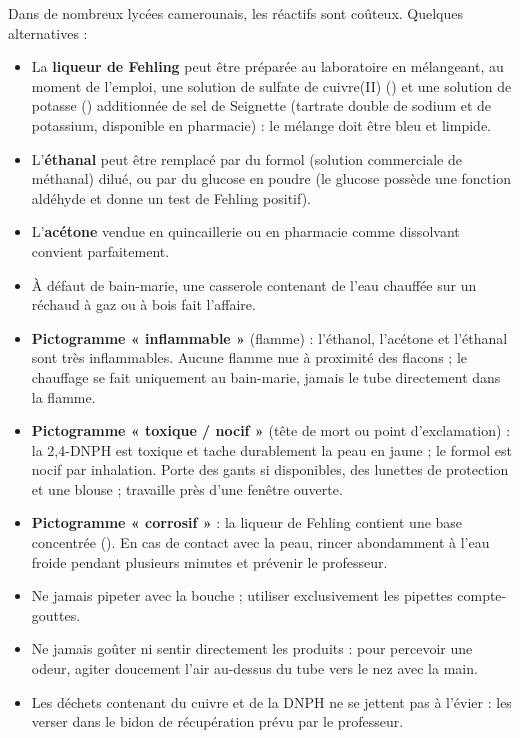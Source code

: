\documentclass[11pt]{article}
\newcommand{\cle}[1]{{\popxbold\color{popdark}#1}}
\newcounter{popsec}
\newcounter{popsub}
\newcommand{\courssub}[1]{%
  \stepcounter{popsub}%
  \par\vspace{9pt}\noindent{\popxbold\fontsize{11.5}{13}\selectfont\color{popink}{\color{poporange}\thepopsec.\thepopsub}\hspace{6pt}#1}\par\nopagebreak\vspace{4pt}
}
\begin{document}
\begin{savaistu}
Dans de nombreux lycées camerounais, les réactifs sont coûteux. Quelques alternatives :
\begin{itemize}
\item La \textbf{liqueur de Fehling} peut être préparée au laboratoire en mélangeant, au moment de l'emploi, une solution de sulfate de cuivre(II) () et une solution de potasse () additionnée de sel de Seignette (tartrate double de sodium et de potassium, disponible en pharmacie) : le mélange doit être bleu et limpide.
\item L'\textbf{éthanal} peut être remplacé par du formol (solution commerciale de méthanal) dilué, ou par du glucose en poudre (le glucose possède une fonction aldéhyde et donne un test de Fehling positif).
\item L'\textbf{acétone} vendue en quincaillerie ou en pharmacie comme dissolvant convient parfaitement.
\item À défaut de bain-marie, une casserole contenant de l'eau chauffée sur un réchaud à gaz ou à bois fait l'affaire.
\end{itemize}
\end{savaistu}

\courssub{Sécurité}

\begin{attention}
\begin{itemize}
\item \textbf{Pictogramme « inflammable »} (flamme) : l'éthanol, l'acétone et l'éthanal sont très inflammables. Aucune flamme nue à proximité des flacons ; le chauffage se fait uniquement au \cle{bain-marie}, jamais le tube directement dans la flamme.
\item \textbf{Pictogramme « toxique / nocif »} (tête de mort ou point d'exclamation) : la 2,4-DNPH est toxique et tache durablement la peau en jaune ; le formol est nocif par inhalation. Porte des gants si disponibles, des lunettes de protection et une blouse ; travaille près d'une fenêtre ouverte.
\item \textbf{Pictogramme « corrosif »} : la liqueur de Fehling contient une base concentrée (). En cas de contact avec la peau, rincer abondamment à l'eau froide pendant plusieurs minutes et prévenir le professeur.
\item Ne jamais pipeter avec la bouche ; utiliser exclusivement les pipettes compte-gouttes.
\item Ne jamais goûter ni sentir directement les produits : pour percevoir une odeur, agiter doucement l'air au-dessus du tube vers le nez avec la main.
\item Les déchets contenant du cuivre et de la DNPH ne se jettent pas à l'évier : les verser dans le bidon de récupération prévu par le professeur.
\end{itemize}
\end{attention}
\end{document}
